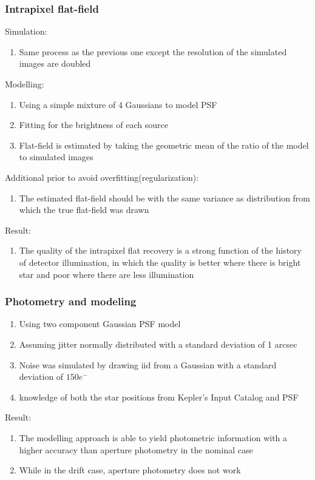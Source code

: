 \documentclass[]{article}
\begin{document}
\subsubsection{Intrapixel flat-field}
Simulation:
\begin{enumerate}
 \item Same process as the previous one except the resolution of the simulated images are doubled
\end{enumerate} 
Modelling:
\begin{enumerate}
 \item Using a simple mixture of 4 Gaussians to model PSF
 \item Fitting for the brightness of each source 
 \item Flat-field is estimated by taking the geometric mean of the ratio of the model to simulated images
\end{enumerate} 
Additional prior to avoid overfitting(regularization):
\begin{enumerate}
 \item The estimated flat-field should be with the same variance as distribution from which the true flat-field was drawn
\end{enumerate} 
Result:
\begin{enumerate}
 \item The quality of the intrapixel flat recovery is a strong function of the history of detector illumination, in which the quality is better where there is bright star and poor where there are less  illumination
\end{enumerate} 

\subsubsection{Photometry and modeling}
\begin{enumerate}
 \item  Using two component Gaussian PSF model
 \item  Assuming jitter normally  distributed with a standard deviation of 1 arcsec
 \item Noise was simulated by drawing iid from a Gaussian with a standard deviation of $150e^{-}$
 \item knowledge of both the star positions from Kepler's Input Catalog and PSF
\end{enumerate}
Result:
\begin{enumerate}
 \item  The modelling approach is able to yield photometric information with a higher accuracy than aperture photometry in the nominal case
 \item  While in the drift case, aperture photometry does not work
\end{enumerate}
\end{document}
